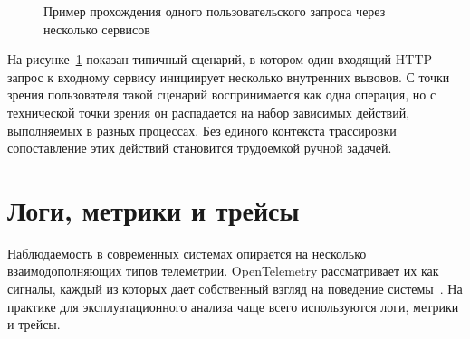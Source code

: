 \begin{figure}[H]
    \centering
    \caption{Пример прохождения одного пользовательского запроса через несколько сервисов}
    \label{fig:distributed-request}
\end{figure}

На рисунке~\ref{fig:distributed-request} показан типичный сценарий, в котором один
входящий HTTP-запрос к входному сервису инициирует несколько внутренних вызовов.
С точки зрения пользователя такой сценарий воспринимается как одна операция, но с
технической точки зрения он распадается на набор зависимых действий, выполняемых в
разных процессах. Без единого контекста трассировки сопоставление этих действий
становится трудоемкой ручной задачей.

\section{Логи, метрики и трейсы}

Наблюдаемость в современных системах опирается на несколько взаимодополняющих
типов телеметрии. OpenTelemetry рассматривает их как сигналы, каждый из которых
дает собственный взгляд на поведение системы~\cite{otelSignals,otelOverview}. На
практике для эксплуатационного анализа чаще всего используются логи, метрики и
трейсы.

